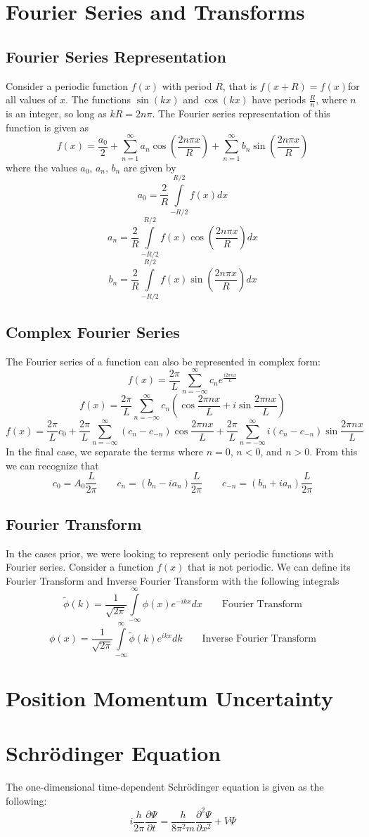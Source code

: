 \documentclass[11pt]{article}
\begin{document}
\section{Fourier Series and Transforms}
\subsection{Fourier Series Representation}
Consider a periodic function $f (x)$ with period $R$, that is $f (x + R) = f (x) $for all values of $x$. The functions $\sin(kx)$ and $\cos(kx)$ have periods $\frac{R}{n}$, where $n$ is an integer, so long as $kR = 2n\pi$. The Fourier series representation of this function is given as
$$ f(x) = \frac{a_0}{2} + \sum_{n=1}^{\infty} a_n \cos \left( \frac{2n\pi x}{R}\right) + \sum_{n=1}^{\infty} b_n \sin \left( \frac{2n\pi x}{R}\right)$$
where the values $a_0$, $a_n$, $b_n$ are given by
$$ a_0 = \frac{2}{R} \int \limits_{-R/2}^{R/2} f(x)  dx$$
$$ a_n = \frac{2}{R} \int \limits_{-R/2}^{R/2} f(x) \cos \left( \frac{2n\pi x}{R}\right) dx$$
$$ b_n = \frac{2}{R} \int \limits_{-R/2}^{R/2} f(x) \sin \left( \frac{2n\pi x}{R}\right) dx$$
\subsection{Complex Fourier Series}
The Fourier series of a function can also be represented in complex form:
$$f(x) = \frac{2\pi}{L} \sum_{n=-\infty}^{\infty} c_n e^{\frac{i2\pi n x}{L}}$$
$$f(x) = \frac{2\pi}{L} \sum_{n=-\infty}^{\infty} c_n \left( \cos \frac{2\pi n x}{L} + i \sin \frac{2\pi n x}{L}\right)$$
$$f(x) = \frac{2\pi}{L} c_0 + \frac{2\pi}{L} \sum_{n=-\infty}^{\infty} (c_n - c_{-n})  \cos \frac{2\pi n x}{L} + \frac{2\pi}{L} \sum_{n=-\infty}^{\infty} i (c_n - c_{-n}) \sin \frac{2\pi n x}{L}$$
In the final case, we separate the terms where $n=0$, $n < 0$, and $n > 0$. From this we can recognize that
$$ c_0 = A_0 \frac{L}{2\pi} \quad \quad c_n = (b_n - ia_n) \frac{L}{2\pi} \quad \quad c_{-n} = (b_n + ia_n) \frac{L}{2\pi} $$
\subsection{Fourier Transform}
In the cases prior, we were looking to represent only periodic functions with Fourier series. Consider a function $f(x)$ that is not periodic. We can define its Fourier Transform and Inverse Fourier Transform with the following integrals
$$ \tilde{\phi} (k) = \frac{1}{\sqrt{2\pi}} \int \limits_{-\infty}^{\infty} \phi(x) e^{-ikx} dx \quad \quad  \text{Fourier Transform} $$
$$ {\phi} (x) = \frac{1}{\sqrt{2\pi}} \int \limits_{-\infty}^{\infty} \tilde{\phi} (k) e^{ikx} dk\quad \quad  \text{Inverse Fourier Transform} $$
\section{Position Momentum Uncertainty}

\section{Schrödinger Equation}
The one-dimensional time-dependent Schrödinger equation is given as the following:
$$i\frac{h}{2\pi} \frac{\partial \Psi}{\partial t} = \frac{h}{8\pi^2m} \frac{\partial^2 \Psi}{\partial x^2} + V\Psi $$
\end{document}
